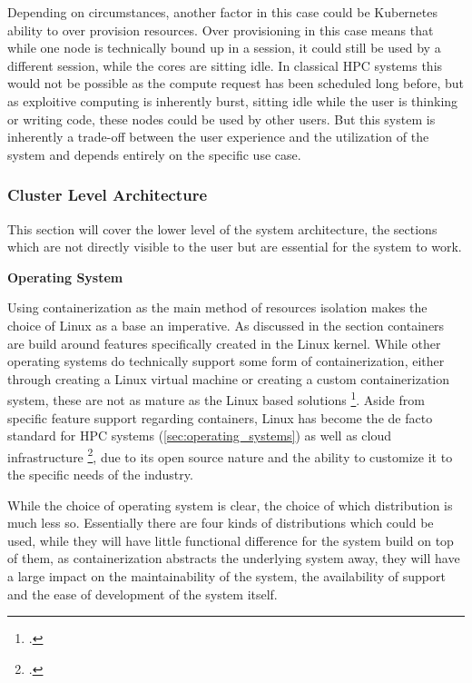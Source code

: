 Depending on circumstances, another factor in this case could be Kubernetes ability to
over provision resources.
Over provisioning in this case means that while one node is technically bound up in a session,
it could still be used by a different session, while the cores are sitting idle.
In classical \ac{HPC} systems this would not be possible as the compute request
has been scheduled long before, but as exploitive computing is inherently burst,
sitting idle while the user is thinking or writing code, these nodes could be used by other users.
But this system is inherently a trade-off between the user experience and the utilization of the system and
depends entirely on the specific use case.

\subsubsection{Cluster Level Architecture}

This section will cover the lower level of the system architecture,
the sections which are not directly visible to the user but are essential for the system to work.

\textbf{Operating System}
\label{asp:operating_system}

Using containerization as the main method of resources isolation makes the
choice of Linux as a base an imperative.
As discussed in the section  containers are
build around features specifically created in the Linux kernel.
While other operating systems do technically support some form of containerization,
either through creating a Linux virtual machine or creating
a custom containerization system, these are not as mature as the Linux based solutions
\footcite{mcgrathServerlessComputingDesign2017}.
Aside from specific feature support regarding containers,
Linux has become the de facto standard for \ac{HPC} systems (\ref{sec:operating_systems})
as well as cloud infrastructure \footcite{stevenvaughan-nicholsCanInternetExist},
due to its open source nature and the ability to customize it to the specific needs of the industry.

While the choice of operating system is clear, the choice of which \gls{distribution} is much less so.
Essentially there are four kinds of distributions which could be used,
while they will have little functional difference for the system build on top of them,
as containerization abstracts the underlying system away, they will have a large impact on the maintainability of the system,
the availability of support and the ease of development of the system itself.

